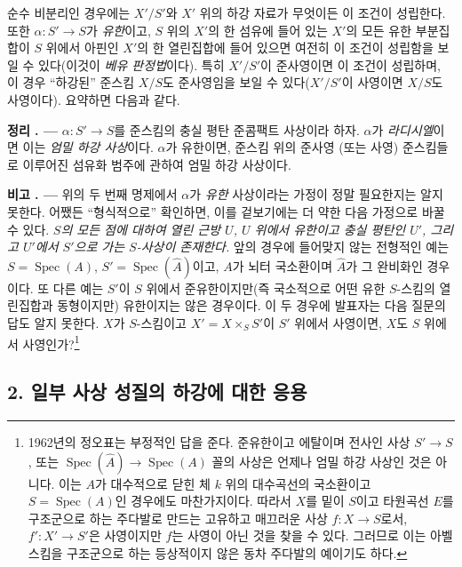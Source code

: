 \documentclass[11pt,twoside,openany]{book}
\numberwithin{equation}{section}
\newcommand{\sourceunit}{front}
\newcommand{\src}[1]{%
  \phantomsection\hypertarget{src:\sourceunit:#1}{}%
  \marginpar{\raggedleft\footnotesize\sffamily #1}%
}
\theoremstyle{plain}
\theoremstyle{definition}
\theoremstyle{remark}
\newcommand{\result}[2]{%
  \par\medskip\noindent\textbf{#1%
  \if\relax\detokenize{#2}\relax\else\space#2\fi. ---}\enspace
}
\begin{document}
\src{318}
순수 비분리인 경우에는 $X'/S'$와 $X'$ 위의 하강 자료가 무엇이든
이 조건이 성립한다. 또한 $\alpha:S'\longrightarrow S$가
\emph{유한}이고, $S$ 위의 $X'$의 한 섬유에 들어 있는 $X'$의 모든
유한 부분집합이 $S$ 위에서 아핀인 $X'$의 한 열린집합에 들어 있으면
여전히 이 조건이 성립함을 보일 수 있다(이것이 \emph{베유 판정법}이다).
특히 $X'/S'$이 준사영이면 이 조건이 성립하며, 이 경우 “하강된”
준스킴 $X/S$도 준사영임을 보일 수 있다($X'/S'$이 사영이면 $X/S$도
사영이다). 요약하면 다음과 같다.

\result{정리}{3} $\alpha:S'\longrightarrow S$를 준스킴의 충실 평탄
준콤팩트 사상이라 하자. $\alpha$가 \emph{라디시엘}이면 이는
\emph{엄밀 하강 사상}이다. $\alpha$가 유한이면, 준스킴 위의 준사영
(또는 사영) 준스킴들로 이루어진 섬유화 범주에 관하여 엄밀 하강
사상이다.

\result{비고}{} 위의 두 번째 명제에서 $\alpha$가 \emph{유한} 사상이라는
가정이 정말 필요한지는 알지 못한다. 어쨌든 “형식적으로” 확인하면,
이를 겉보기에는 더 약한 다음 가정으로 바꿀 수 있다. \emph{$S$의 모든
점에 대하여 열린 근방 $U$, $U$ 위에서 유한이고 충실 평탄인 $U'$,
그리고 $U'$에서 $S'$으로 가는 $S$-사상이 존재한다.} 앞의 경우에
들어맞지 않는 전형적인 예는
$S=\operatorname{Spec}(A)$,
$S'=\operatorname{Spec}(\widehat A)$이고, $A$가 뇌터 국소환이며
$\widehat A$가 그 완비화인 경우이다. 또 다른 예는 $S'$이 $S$ 위에서
준유한이지만(즉 국소적으로 어떤 유한 $S$-스킴의 열린집합과
동형이지만) 유한이지는 않은 경우이다. 이 두 경우에 발표자는 다음
질문의 답도 알지 못한다. $X$가 $S$-스킴이고
$X'=X\times_SS'$이 $S'$ 위에서 사영이면, $X$도 $S$ 위에서
사영인가?\footnote{1962년의 정오표는 부정적인 답을 준다.
준유한이고 에탈이며 전사인 사상 $S'\longrightarrow S$, 또는
$\operatorname{Spec}(\widehat A)\longrightarrow\operatorname{Spec}(A)$
꼴의 사상은 언제나 엄밀 하강 사상인 것은 아니다. 이는 $A$가
대수적으로 닫힌 체 $k$ 위의 대수곡선의 국소환이고
$S=\operatorname{Spec}(A)$인 경우에도 마찬가지이다. 따라서
$X$를 밑이 $S$이고 타원곡선 $E$를 구조군으로 하는 주다발로 만드는 고유하고
매끄러운 사상 $f:X\longrightarrow S$로서,
$f':X'\longrightarrow S'$은 사영이지만 $f$는 사영이 아닌 것을
찾을 수 있다. 그러므로 이는 아벨 스킴을 구조군으로 하는 등상적이지
않은 동차 주다발의 예이기도 하다.}

\subsection*{2. 일부 사상 성질의 하강에 대한 응용}
\end{document}
